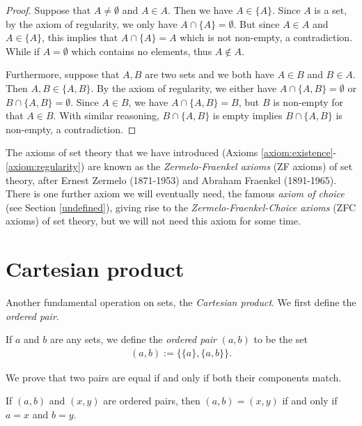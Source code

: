 \begin{proof}
Suppose that $A \neq \emptyset$ and $A \in A$. Then we have $A \in \{A\}$. Since $A$ is a set, by the axiom of regularity, we only have $A \cap \{A\} = \emptyset$. But since $A \in A$ and $A \in \{A\}$, this implies that $A \cap \{A\} = A$ which is not non-empty, a contradiction. While if $A = \emptyset$ which contains no elements, thus $A \notin A$.

Furthermore, suppose that $A, B$ are two sets and we both have $A \in B$ and $B \in A$. Then $A,B \in \{A, B\}$. By the axiom of regularity, we either have $A \cap \{A, B\} = \emptyset$ or $B \cap \{A,B\} = \emptyset$. Since $A \in B$, we have $A \cap \{A, B\} = B$, but $B$ is non-empty for that $A \in B$. With similar reasoning, $B \cap \{A,B\}$ is empty implies $B \cap \{A,B\}$ is non-empty, a contradiction.
\end{proof}

\begin{remark}
    The axioms of set theory that we have introduced (Axioms \ref{axiom:existence}-\ref{axiom:regularity}) are known as the \emph{Zermelo-Fraenkel axioms} (ZF axioms) of set theory, after Ernest Zermelo (1871-1953) and Abraham Fraenkel (1891-1965). There is one further axiom we will eventually need, the famous \emph{axiom of choice} (see Section \ref{undefined}), giving rise to the \emph{Zermelo-Fraenkel-Choice axioms} (ZFC axioms) of set theory, but we will not need this axiom for some time.
\end{remark}

\section{Cartesian product}

Another fundamental operation on sets, the \emph{Cartesian product}. We first define the \emph{ordered pair}.

\begin{definition}
    If $a$ and $b$ are any sets, we define the \emph{ordered pair} $(a, b)$ to be the set
    \begin{align*}
        (a, b) := \{\{a\}, \{a, b\}\}.
    \end{align*}
\end{definition}

We prove that two pairs are equal if and only if both their components match.

\begin{lemma}
    If $(a, b)$ and $(x, y)$ are ordered pairs, then $(a, b) = (x, y)$ if and only if $a = x$ and $b = y$.
\end{lemma}

